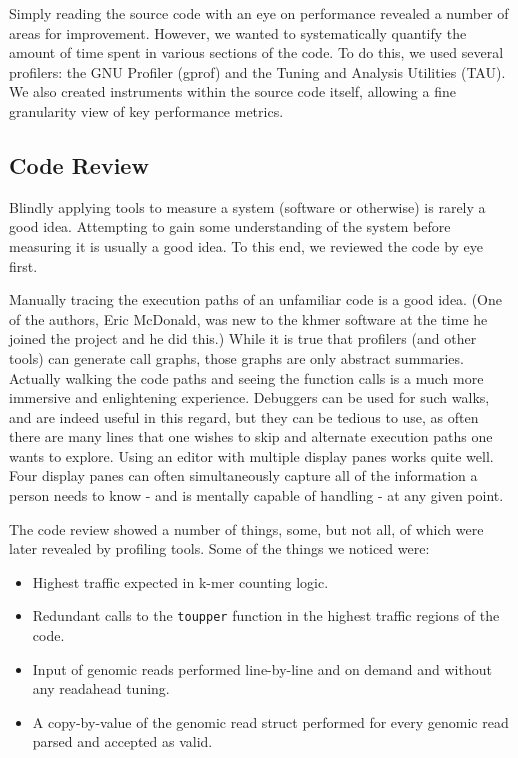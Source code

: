\documentclass{article}
\begin{document}
Simply reading the source code with an eye on performance revealed a number of areas for improvement. However, we wanted to systematically quantify the amount of time spent in various sections of the code. To do this, we used several profilers: the GNU Profiler (gprof) and the Tuning and Analysis Utilities (TAU). We also created instruments within the source code itself, allowing a fine granularity view of key performance metrics.

\subsection{Code Review}

Blindly applying tools to measure a system (software or otherwise) is rarely a good idea. Attempting to gain some understanding of the system before measuring it is usually a good idea. To this end, we reviewed the code by eye first.

Manually tracing the execution paths of an unfamiliar code is a good idea. (One of the authors, Eric McDonald, was new to the khmer software at the time he joined the project and he did this.) While it is true that profilers (and other tools) can generate call graphs, those graphs are only abstract summaries. Actually walking the code paths and seeing the function calls is a much more immersive and enlightening experience. Debuggers can be used for such walks, and are indeed useful in this regard, but they can be tedious to use, as often there are many lines that one wishes to skip and alternate execution paths one wants to explore. Using an editor with multiple display panes works quite well. Four display panes can often simultaneously capture all of the information a person needs to know - and is mentally capable of handling - at any given point.

The code review showed a number of things, some, but not all, of which were later revealed by profiling tools. Some of the things we noticed were:

\begin{itemize}
\item Highest traffic expected in k-mer counting logic.
\item Redundant calls to the \texttt{toupper} function in the highest traffic regions of the code.
\item Input of genomic reads performed line-by-line and on demand and without any readahead tuning.
\item A copy-by-value of the genomic read struct performed for every genomic read parsed and accepted as valid.
\end{itemize}
\end{document}

